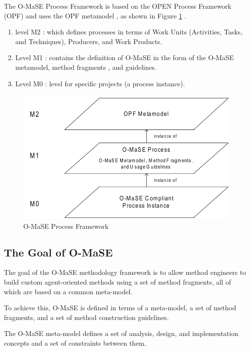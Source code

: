 The O-MaSE Process Framework is based on the OPEN Process Framework (OPF)
 and uses the OPF metamodel  , as shown in Figure \ref{fig:O-MaSE Process Framework}  .\cite{omacs4}

\begin{enumerate}
\item 
	level M2 : which defines processes in terms of Work Units (Activities, Tasks, and Techniques),
	 Producers, and Work Products.
\item
	Level M1 : contains the definition of O-MaSE in the form of the O-MaSE metamodel, method fragments
	, and guidelines. 
\item
	Level M0  : level for specific projects (a process instance).
\end{enumerate} 

\begin{figure}[th]
	\centering %
		\includegraphics[scale=0.4]{chapiter1/img/omase}
	\caption{\label{fig:O-MaSE Process Framework}O-MaSE Process Framework \cite{omacs4} }
\end{figure}
\subsection{ The Goal of O-MaSE }

The goal of the O-MaSE methodology framework is to allow method engineers to
build custom agent-oriented methods using a set of method fragments, all of which are
based on a common meta-model. \cite{omacs7}

To achieve this, O-MaSE is defined in terms of a meta-model, a set of method fragments, and a set of method construction guidelines. 

The O-MaSE meta-model defines a set of analysis, design, and implementation concepts and a
set of constraints between them. 

